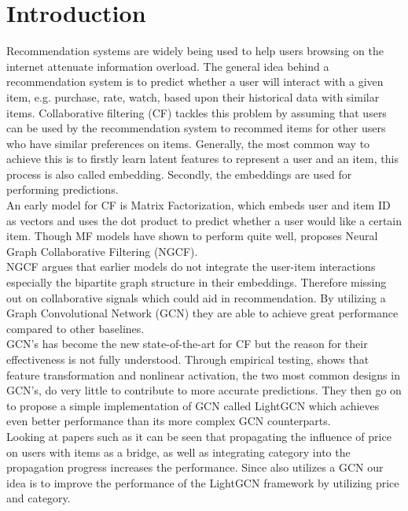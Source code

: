\section{Introduction}
Recommendation systems are widely being used to help users browsing on the internet attenuate information overload\cite{YT_rec,Pint_rec}.
The general idea behind a recommendation system is to predict whether a user will interact with a given item, e.g. purchase, rate, watch, based upon their historical data with similar items.
Collaborative filtering (CF) tackles this problem by assuming that users can be used by the recommendation system to recommed items for other users who have similar preferences on items.
Generally, the most common way to achieve this is to firstly learn latent features to represent a user and an item, this process is also called embedding.
Secondly, the embeddings are used for performing predictions.
\\
An early model for CF is Matrix Factorization, which embeds user and item ID as vectors and uses the dot product to predict whether a user would like a certain item.
Though MF models have shown to perform quite well, \cite{NGCF_2019} proposes Neural Graph Collaborative Filtering (NGCF).
\\ 
NGCF argues that earlier models do not integrate the user-item interactions especially the bipartite graph structure in their embeddings.
Therefore missing out on collaborative signals which could aid in recommendation.
By utilizing a Graph Convolutional Network (GCN) they are able to achieve great performance compared to other baselines.
\\
GCN's has become the new state-of-the-art for CF but the reason for their effectiveness is not fully understood\cite{lightgcn}.
Through empirical testing, \cite{lightgcn} shows that feature transformation and nonlinear activation, the two most common designs in GCN's, do very little to contribute to more accurate predictions.
They then go on to propose a simple implementation of GCN called LightGCN which achieves even better performance than its more complex GCN counterparts.
\\
Looking at papers such as \cite{Priceaware} it can be seen that propagating the influence of price on users with items as a bridge, as well as integrating category into the propagation progress increases the performance.
Since \cite{Priceaware} also utilizes a GCN our idea is to improve the performance of the LightGCN framework by utilizing price and category.
